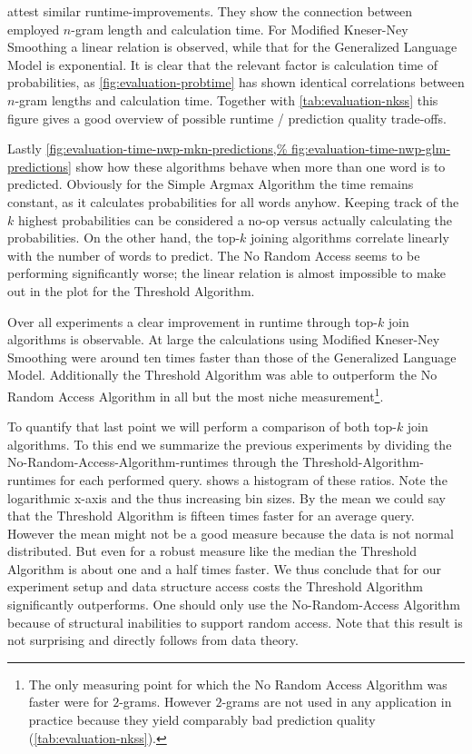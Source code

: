 attest similar runtime-improvements.
They show the connection between employed $n$-gram length and calculation time.
For Modified Kneser-Ney Smoothing a linear relation is observed, while that for
the Generalized Language Model is exponential.
It is clear that the relevant factor is calculation time of probabilities, as
\cref{fig:evaluation-probtime} has shown identical correlations between $n$-gram
lengths and calculation time.
Together with \cref{tab:evaluation-nkss} this figure gives a good overview of
possible runtime / prediction quality trade-offs.

Lastly \cref{fig:evaluation-time-nwp-mkn-predictions,%
fig:evaluation-time-nwp-glm-predictions} show how these algorithms behave
when more than one word is to predicted.
Obviously for the Simple Argmax Algorithm the time remains constant, as it
calculates probabilities for all words anyhow.
Keeping track of the $k$ highest probabilities can be considered a no-op versus
actually calculating the probabilities.
On the other hand, the top-$k$ joining algorithms correlate linearly with
the number of words to predict.
The No Random Access seems to be performing significantly worse; the linear
relation is almost impossible to make out in the plot for the Threshold
Algorithm.

Over all experiments a clear improvement in runtime through top-$k$ join
algorithms is observable.
At large the calculations using Modified Kneser-Ney Smoothing were around ten
times faster than those of the Generalized Language Model.
Additionally the Threshold Algorithm was able to outperform the No Random Access
Algorithm in all but the most niche measurement\footnote{The only measuring
point for which the No Random Access Algorithm was faster were for $2$-grams.
However $2$-grams are not used in any application in practice because they yield
comparably bad prediction quality (\cref{tab:evaluation-nkss}).}.

To quantify that last point we will perform a comparison of both top-$k$ join
algorithms.
To this end we summarize the previous experiments by dividing the
No-Random-Access-Algorithm-runtimes through the Threshold-Algorithm-runtimes
for each performed query.
 shows a histogram of these ratios.
Note the logarithmic x-axis and the thus increasing bin sizes.
By the mean we could say that the Threshold Algorithm is fifteen times faster
for an average query.
However the mean might not be a good measure because the data is not normal
distributed.
But even for a robust measure like the median the Threshold Algorithm is about
one and a half times faster.
We thus conclude that for our experiment setup and data structure access costs
the Threshold Algorithm significantly outperforms.
One should only use the No-Random-Access Algorithm because of structural
inabilities to support random access.
Note that this result is not surprising and directly follows from data theory.

